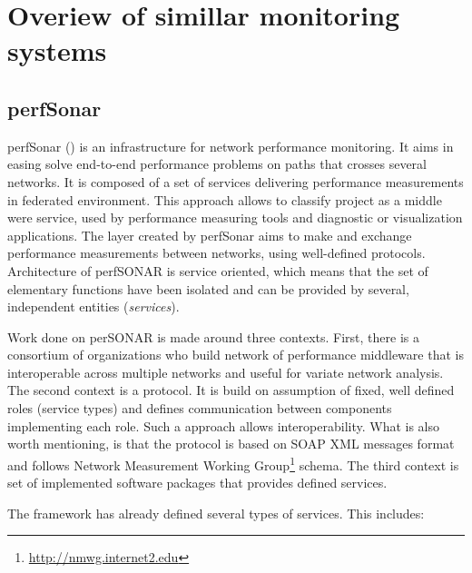 %
 
 
\section{Overiew of simillar monitoring systems}
\label{sec:ch2_similar}


\subsection{perfSonar}

perfSonar (\cite{perfSonar1,perfSonar2,perfSonar3}) is an infrastructure for network performance monitoring. It aims in easing solve end-to-end performance problems on paths that crosses several networks. It is composed of a set of services delivering performance measurements in federated environment. This approach allows to classify project as a middle were service, used by performance measuring tools and diagnostic or visualization applications. The layer created by perfSonar aims to make and exchange performance measurements between networks, using well-defined protocols.  Architecture of perfSONAR is service oriented, which means that the set of elementary functions have been isolated and can be provided by several, independent entities (\emph{services}).

Work done on perSONAR is made around three contexts. First, there is a consortium of organizations who build network of performance middleware that is interoperable across multiple networks and useful for variate network analysis. The second context is a protocol. It is build on assumption of fixed, well defined roles (service types) and defines communication between components implementing each role. Such a approach allows interoperability. What is also worth mentioning, is that the protocol is based on SOAP XML messages format and follows Network Measurement Working Group\footnote{\url{http://nmwg.internet2.edu}} schema.  The third context is set of implemented software packages that provides defined services.


The framework has already defined several types of services. This includes:

